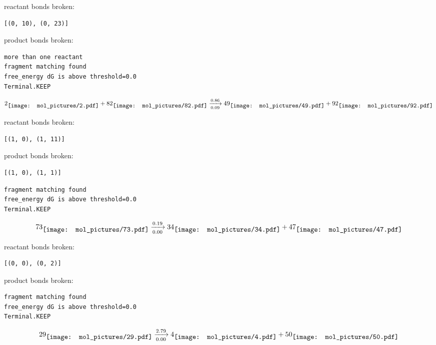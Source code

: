 \documentclass{article}
\begin{document}
reactant bonds broken:\begin{verbatim}
[(0, 10), (0, 23)]
\end{verbatim}
product bonds broken:



\vspace{1cm}
\begin{verbatim}
more than one reactant
fragment matching found
free_energy dG is above threshold=0.0
Terminal.KEEP
\end{verbatim}
$$
2
\raisebox{-.5\height}{\texttt{[image: mol\_pictures/2.pdf]}}
+
82
\raisebox{-.5\height}{\texttt{[image: mol\_pictures/82.pdf]}}
\xrightarrow[0.09]{0.86}
49
\raisebox{-.5\height}{\texttt{[image: mol\_pictures/49.pdf]}}
+
92
\raisebox{-.5\height}{\texttt{[image: mol\_pictures/92.pdf]}}
$$


reactant bonds broken:\begin{verbatim}
[(1, 0), (1, 11)]
\end{verbatim}
product bonds broken:\begin{verbatim}
[(1, 0), (1, 1)]
\end{verbatim}




\vspace{1cm}
\begin{verbatim}
fragment matching found
free_energy dG is above threshold=0.0
Terminal.KEEP
\end{verbatim}
$$
73
\raisebox{-.5\height}{\texttt{[image: mol\_pictures/73.pdf]}}
\xrightarrow[0.00]{0.19}
34
\raisebox{-.5\height}{\texttt{[image: mol\_pictures/34.pdf]}}
+
47
\raisebox{-.5\height}{\texttt{[image: mol\_pictures/47.pdf]}}
$$


reactant bonds broken:\begin{verbatim}
[(0, 0), (0, 2)]
\end{verbatim}
product bonds broken:



\vspace{1cm}
\begin{verbatim}
fragment matching found
free_energy dG is above threshold=0.0
Terminal.KEEP
\end{verbatim}
$$
29
\raisebox{-.5\height}{\texttt{[image: mol\_pictures/29.pdf]}}
\xrightarrow[0.00]{2.79}
4
\raisebox{-.5\height}{\texttt{[image: mol\_pictures/4.pdf]}}
+
50
\raisebox{-.5\height}{\texttt{[image: mol\_pictures/50.pdf]}}
$$
\end{document}

